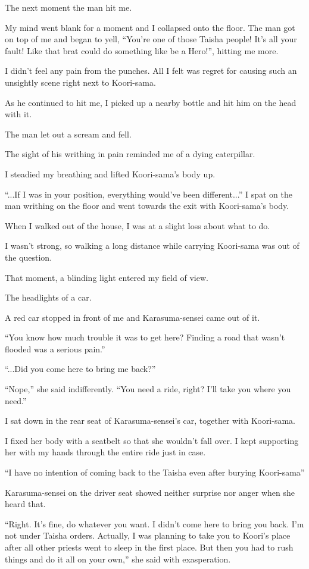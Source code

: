 The next moment the man hit me.

My mind went blank for a moment and I collapsed onto the floor. The man got on top of me and began to yell, ``You're one of those Taisha people! It's all your fault! Like that brat could do something like be a Hero!'', hitting me more.

I didn't feel any pain from the punches. All I felt was regret for causing such an unsightly scene right next to Koori-sama.

As he continued to hit me, I picked up a nearby bottle and hit him on the head with it.

The man let out a scream and fell.

The sight of his writhing in pain reminded me of a dying caterpillar.

I steadied my breathing and lifted Koori-sama's body up.

``...If I was in your position, everything would've been different...'' I spat on the man writhing on the floor and went towards the exit with Koori-sama's body.

When I walked out of the house, I was at a slight loss about what to do.

I wasn't strong, so walking a long distance while carrying Koori-sama was out of the question.

That moment, a blinding light entered my field of view.

The headlights of a car.

A red car stopped in front of me and Karasuma-sensei came out of it.

``You know how much trouble it was to get here? Finding a road that wasn't flooded was a serious pain.''

``...Did you come here to bring me back?''

``Nope,'' she said indifferently. ``You need a ride, right? I'll take you where you need.''

I sat down in the rear seat of Karasuma-sensei's car, together with Koori-sama.

I fixed her body with a seatbelt so that she wouldn't fall over. I kept supporting her with my hands through the entire ride just in case.

``I have no intention of coming back to the Taisha even after burying Koori-sama''

Karasuma-sensei on the driver seat showed neither surprise nor anger when she heard that.

``Right. It's fine, do whatever you want. I didn't come here to bring you back. I'm not under Taisha orders. Actually, I was planning to take you to Koori's place after all other priests went to sleep in the first place. But then you had to rush things and do it all on your own,'' she said with exasperation.


